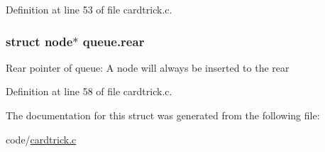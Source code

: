 Definition at line 53 of file cardtrick.c.

\hypertarget{structqueue_aa5381eaa02a38f052e2d0fdf59849af3}{
\subsubsection[{rear}]{\setlength{\rightskip}{0pt plus 5cm}struct {\bf node}$\ast$ {\bf queue.rear}}}
\label{structqueue_aa5381eaa02a38f052e2d0fdf59849af3}
Rear pointer of queue: A node will always be inserted to the rear 

Definition at line 58 of file cardtrick.c.



The documentation for this struct was generated from the following file:\begin{DoxyCompactItemize}
\item 
code/\hyperlink{cardtrick_8c}{cardtrick.c}\end{DoxyCompactItemize}
